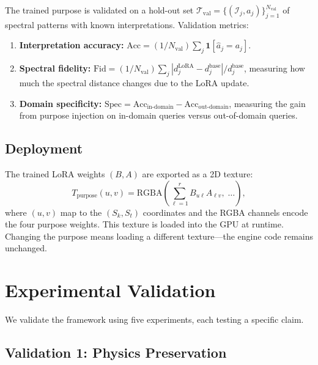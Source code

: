 \documentclass[11pt,twocolumn,a4paper]{article}
\theoremstyle{definition}
\theoremstyle{remark}
\newcommand{\Sk}{S_{k}}
\newcommand{\St}{S_{t}}
\begin{document}
The trained purpose is validated on a hold-out set $\mathcal{T}_{\mathrm{val}} = \{(\mathcal{I}_j, a_j)\}_{j=1}^{N_{\mathrm{val}}}$ of spectral patterns with known interpretations.  Validation metrics:
\begin{enumerate}
    \item \textbf{Interpretation accuracy:} $\mathrm{Acc} = (1/N_{\mathrm{val}}) \sum_j \mathbf{1}[\hat{a}_j = a_j]$.
    \item \textbf{Spectral fidelity:} $\mathrm{Fid} = (1/N_{\mathrm{val}}) \sum_j |d_j^{\mathrm{LoRA}} - d_j^{\mathrm{base}}| / d_j^{\mathrm{base}}$, measuring how much the spectral distance changes due to the LoRA update.
    \item \textbf{Domain specificity:} $\mathrm{Spec} = \mathrm{Acc}_{\mathrm{in\text{-}domain}} - \mathrm{Acc}_{\mathrm{out\text{-}domain}}$, measuring the gain from purpose injection on in-domain queries versus out-of-domain queries.
\end{enumerate}

\subsection{Deployment}

The trained LoRA weights $(B, A)$ are exported as a 2D texture:
\begin{equation}\label{eq:texture-encoding}
    T_{\mathrm{purpose}}(u, v) = \mathrm{RGBA}\!\left(\sum_{\ell=1}^r B_{u\ell} A_{\ell v},\; \ldots\right),
\end{equation}
where $(u, v)$ map to the $(\Sk, \St)$ coordinates and the RGBA channels encode the four purpose weights.  This texture is loaded into the GPU at runtime.  Changing the purpose means loading a different texture---the engine code remains unchanged.


\section{Experimental Validation}\label{sec:experimental-validation}

We validate the framework using five experiments, each testing a specific claim.

\subsection{Validation 1: Physics Preservation}
\end{document}
